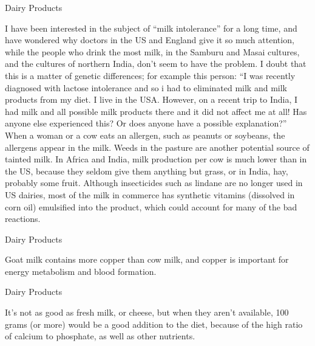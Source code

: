 \documentclass[11pt,oneside,openany,extrafontsizes]{memoir}
\begin{document}
\begin{standalonequote}{Dairy Products}

    \begin{answer}
        I have been interested in the subject of \enquote{milk intolerance} for a long time, and have wondered why doctors in the US and England give it so much attention, while the people who drink the most milk, in the Samburu and Masai cultures, and the cultures of northern India, don't seem to have the problem. I doubt that this is a matter of genetic differences; for example this person: \enquote{I was recently diagnosed with lactose intolerance and so i had to eliminated milk and milk products from my diet. I live in the USA. However, on a recent trip to India, I had milk and all possible milk products there and it did not affect me at all! Has anyone else experienced this? Or does anyone have a possible explanation?}  When a woman or a cow eats an allergen, such as peanuts or soybeans, the allergens appear in the milk. Weeds in the pasture are another potential source of tainted milk. In Africa and India, milk production per cow is much lower than in the US, because they seldom give them anything but grass, or in India, hay, probably some fruit. Although insecticides such as lindane are no longer used in US dairies, most of the milk in commerce has synthetic vitamins (dissolved in corn oil) emulsified into the product, which could account for many of the bad reactions.
    \end{answer}
\end{standalonequote}

\begin{standalonequote}{Dairy Products}

    \begin{answer}
        Goat milk contains more copper than cow milk, and copper is important for energy metabolism and blood formation.
    \end{answer}
\end{standalonequote}

\begin{standalonequote}{Dairy Products}

    \begin{answer}
        It's not as good as fresh milk, or cheese, but when they aren't available, 100 grams (or more) would be a good addition to the diet, because of the high ratio of calcium to phosphate, as well as other nutrients.
    \end{answer}
\end{standalonequote}
\end{document}
